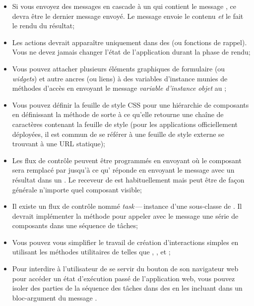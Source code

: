 \documentclass[a4paper,10pt,twoside]{book}
\begin{document}
\begin{itemize}
  \item Si vous envoyez des messages en cascade à un \brush qui
    contient le message , ce  devra être le
    dernier message envoyé.
Le message  envoie le contenu \emph{et} le fait le rendu du résultat;
  \item Les actions devrait apparaître uniquement dans des \callbacks
    (ou fonctions de rappel).
Vous ne devez jamais changer l'état de l'application durant la phase de rendu;
  \item Vous pouvez attacher plusieurs éléments graphiques de
    formulaire (ou \emph{widgets}) et autre ancres (ou liens) à des
    variables d'instance munies de méthodes d'accès en envoyant le
    message  \emph{variable d'instance}  \emph{objet}
    au \brush;
  \item Vous pouvez définir la feuille de style CSS pour une
    hiérarchie de composants en définissant la méthode  de
    sorte à ce qu'elle retourne une chaîne de caractères contenant la
    feuille de style (pour les applications officiellement déployées,
    il est commun de se référer à une feuille de style externe se
    trouvant à une URL statique);
  \item Les flux de contrôle
peuvent être programmés en envoyant  où le composant
 sera remplacé par  jusqu'à ce qu' réponde en
envoyant le message  avec un résultat dans un \callback.
Le receveur de  est habituellement  mais peut être
de façon générale n'importe quel composant visible;
  \item Il existe un flux de contrôle
nommé \emph{task}\,---\,instance d'une sous-classe de . Il
devrait implémenter la méthode  pour appeler avec le message
 une série de composants dans une séquence de tâches;
  \item Vous pouvez vous simplifier le travail de création
    d'interactions simples en utilisant les méthodes utilitaires de
     telles que , ,
     et ;
  \item Pour interdire à l'utilisateur de se servir du bouton \backbtn
    de son navigateur web pour accéder un état d'exécution passé de
    l'application web, vous pouvez isoler des parties de la séquence
    des tâches dans des \transactions en les incluant dans un
    bloc-argument du message .
\end{itemize}

\ifx\wholebook\relax\else 
   
   
\end{document}
